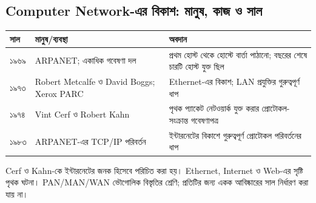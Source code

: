 \subsection{Computer Network-এর বিকাশ: মানুষ, কাজ ও সাল}
\begin{tabularx}{\linewidth}{|p{.15\linewidth}|p{.31\linewidth}|X|}\hline
\textbf{সাল} & \textbf{মানুষ/ব্যবস্থা} & \textbf{অবদান}\\\hline
১৯৬৯ & ARPANET; একাধিক গবেষণা দল & প্রথম হোস্ট থেকে হোস্টে বার্তা পাঠানো; বছরের শেষে চারটি হোস্ট যুক্ত ছিল\\\hline
১৯৭৩ & Robert Metcalfe ও David Boggs; Xerox PARC & Ethernet-এর বিকাশ; LAN প্রযুক্তির গুরুত্বপূর্ণ ধাপ\\\hline
১৯৭৪ & Vint Cerf ও Robert Kahn & পৃথক প্যাকেট নেটওয়ার্ক যুক্ত করার প্রোটোকল-সংক্রান্ত গবেষণাপত্র\\\hline
১৯৮৩ & ARPANET-এর TCP/IP পরিবর্তন & ইন্টারনেটের বিকাশে গুরুত্বপূর্ণ প্রোটোকল পরিবর্তনের ধাপ\\\hline
\end{tabularx}
Cerf ও Kahn-কে ইন্টারনেটের জনক হিসেবে পরিচিত করা হয়। Ethernet, Internet ও Web-এর সৃষ্টি পৃথক ঘটনা। PAN/MAN/WAN ভৌগোলিক বিস্তৃতির শ্রেণি; প্রতিটির জন্য একক আবিষ্কারের সাল নির্ধারণ করা যায় না।
